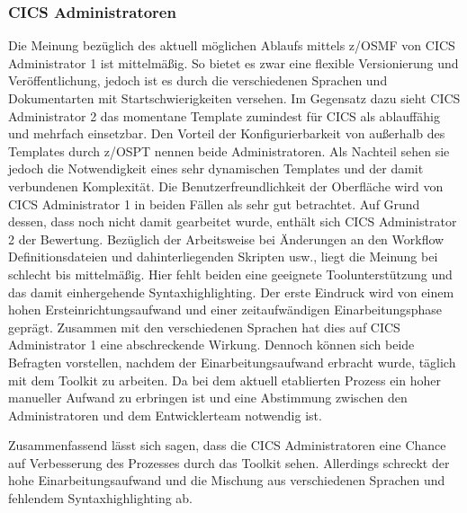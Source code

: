 \subsubsection{CICS Administratoren}
Die Meinung bezüglich des aktuell möglichen Ablaufs mittels z/OSMF von CICS Administrator 1 ist mittelmäßig.
So bietet es zwar eine flexible Versionierung und Veröffentlichung, jedoch ist es durch die verschiedenen Sprachen und Dokumentarten mit Startschwierigkeiten versehen.
Im Gegensatz dazu sieht CICS Administrator 2 das momentane Template zumindest für CICS als ablauffähig und mehrfach einsetzbar.
Den Vorteil der Konfigurierbarkeit von außerhalb des Templates durch z/OSPT nennen beide Administratoren.
Als Nachteil sehen sie jedoch die Notwendigkeit eines sehr dynamischen Templates und der damit verbundenen Komplexität.
Die Benutzerfreundlichkeit der Oberfläche wird von CICS Administrator 1 in beiden Fällen als sehr gut betrachtet.
Auf Grund dessen, dass noch nicht damit gearbeitet wurde, enthält sich CICS Administrator 2 der Bewertung.
Bezüglich der Arbeitsweise bei Änderungen an den Workflow Definitionsdateien und dahinterliegenden Skripten usw., liegt die Meinung bei schlecht bis mittelmäßig.
Hier fehlt beiden eine geeignete Toolunterstützung und das damit einhergehende Syntaxhighlighting.
Der erste Eindruck wird von einem hohen Ersteinrichtungsaufwand und einer zeitaufwändigen Einarbeitungsphase geprägt.
Zusammen mit den verschiedenen Sprachen hat dies auf CICS Administrator 1 eine abschreckende Wirkung.
Dennoch können sich beide Befragten vorstellen, nachdem der Einarbeitungsaufwand erbracht wurde, täglich mit dem Toolkit zu arbeiten.
Da bei dem aktuell etablierten Prozess ein hoher manueller Aufwand zu erbringen ist und eine Abstimmung zwischen den Administratoren und dem Entwicklerteam notwendig ist.

Zusammenfassend lässt sich sagen, dass die CICS Administratoren eine Chance auf Verbesserung des Prozesses durch das Toolkit sehen.
Allerdings schreckt der hohe Einarbeitungsaufwand und die Mischung aus verschiedenen Sprachen und fehlendem Syntaxhighlighting ab.

